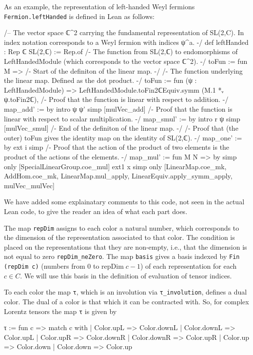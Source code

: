 \documentclass[a4paper, 11pt]{article}
\begin{document}
As an example, the representation of left-handed Weyl fermions  \lstinline|Fermion.leftHanded|
is defined in Lean as follows:
\begin{codeLong}
/-- The vector space ℂ^2 carrying the fundamental representation of SL(2,C).
  In index notation corresponds to a Weyl fermion with indices ψ^a. -/
def leftHanded : Rep ℂ SL(2,ℂ) := Rep.of {
  /- The function from SL(2,ℂ) to endomorphisms of LeftHandedModule 
    (which corresponds to the vector space ℂ^2). -/
  toFun := fun M => {
    /- Start of the definiton of the linear map. -/
    /- The function underlying the linear map. Defined as the dot product. -/
    toFun := fun (ψ : LeftHandedModule) =>
      LeftHandedModule.toFin2ℂEquiv.symm (M.1 *ᵥ ψ.toFin2ℂ),
    /- Proof that the function is linear with respect to addition. -/
    map_add' := by
      intro ψ ψ'
      simp [mulVec_add]
    /- Proof that the function is linear with respect to scalar multiplication. -/
    map_smul' := by
      intro r ψ
      simp [mulVec_smul]
    /- End of the definiton of the linear map. -/}
  /- Proof that (the outer) toFun gives the identity map on the identity of SL(2,ℂ). -/
  map_one' := by
    ext i
    simp
  /- Proof that the action of the product of two elements is 
    the product of the actions of the elements. -/
  map_mul' := fun M N => by
    simp only [SpecialLinearGroup.coe_mul]
    ext1 x
    simp only [LinearMap.coe_mk, AddHom.coe_mk, LinearMap.mul_apply, LinearEquiv.apply_symm_apply,
      mulVec_mulVec]}
\end{codeLong} 
We have added some explainatary comments to this code, not seen in the actual Lean code, to give 
the reader an idea of what each part does. 

The map \lstinline|repDim| assigns to each color a natural number, which corresponds 
to the dimension of the representation associated to that color. The condition is placed on 
the representations that they are non-empty, i.e., that the dimension is not equal to zero \lstinline|repDim_neZero|.  
The map \lstinline|basis| gives a basis indexed by \lstinline|Fin (repDim c)| (numbers from 0 to $\mathrm{repDim}\; c -1 $)  of each representation for each $c \in C$.  
We will use this basis in the definition of evaluation of tensor indices. 

To each color the map \lstinline|τ|, which is an involution via \lstinline|τ_involution|, defines 
a dual color. The dual of a color is that which it can be contracted with. So, for complex Lorentz tensors 
the map \lstinline|τ| is given by 
\begin{code} 
τ := fun c =>
  match c with
  | Color.upL => Color.downL
  | Color.downL => Color.upL
  | Color.upR => Color.downR
  | Color.downR => Color.upR
  | Color.up => Color.down
  | Color.down => Color.up
\end{code}
\end{document}
